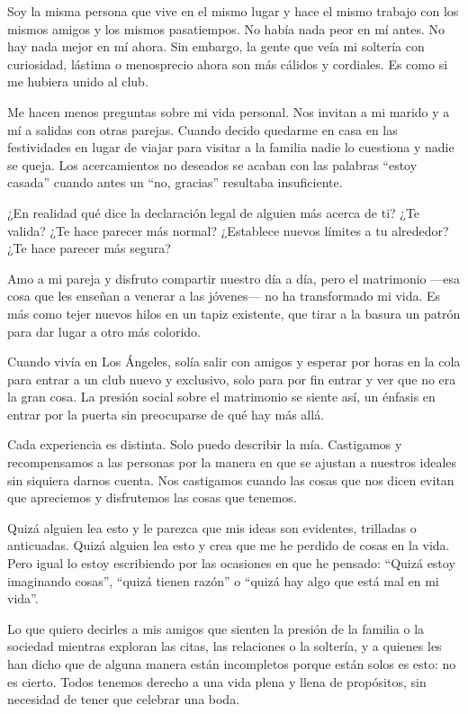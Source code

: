 Soy la misma persona que vive en el mismo lugar y hace el mismo trabajo
con los mismos amigos y los mismos pasatiempos. No había nada peor en mí
antes. No hay nada mejor en mí ahora. Sin embargo, la gente que veía mi
soltería con curiosidad, lástima o menosprecio ahora son más cálidos y
cordiales. Es como si me hubiera unido al club.

Me hacen menos preguntas sobre mi vida personal. Nos invitan a mi marido
y a mí a salidas con otras parejas. Cuando decido quedarme en casa en
las festividades en lugar de viajar para visitar a la familia nadie lo
cuestiona y nadie se queja. Los acercamientos no deseados se acaban con
las palabras ``estoy casada'' cuando antes un ``no, gracias'' resultaba
insuficiente.

¿En realidad qué dice la declaración legal de alguien más acerca de ti?
¿Te valida? ¿Te hace parecer más normal? ¿Establece nuevos límites a tu
alrededor? ¿Te hace parecer más segura?

Amo a mi pareja y disfruto compartir nuestro día a día, pero el
matrimonio ---esa cosa que les enseñan a venerar a las jóvenes--- no ha
transformado mi vida. Es más como tejer nuevos hilos en un tapiz
existente, que tirar a la basura un patrón para dar lugar a otro más
colorido.

Cuando vivía en Los Ángeles, solía salir con amigos y esperar por horas
en la cola para entrar a un club nuevo y exclusivo, solo para por fin
entrar y ver que no era la gran cosa. La presión social sobre el
matrimonio se siente así, un énfasis en entrar por la puerta sin
preocuparse de qué hay más allá.

Cada experiencia es distinta. Solo puedo describir la mía. Castigamos y
recompensamos a las personas por la manera en que se ajustan a nuestros
ideales sin siquiera darnos cuenta. Nos castigamos cuando las cosas que
nos dicen evitan que apreciemos y disfrutemos las cosas que tenemos.

Quizá alguien lea esto y le parezca que mis ideas son evidentes,
trilladas o anticuadas. Quizá alguien lea esto y crea que me he perdido
de cosas en la vida. Pero igual lo estoy escribiendo por las ocasiones
en que he pensado: ``Quizá estoy imaginando cosas'', ``quizá tienen
razón'' o ``quizá hay algo que está mal en mi vida''.

Lo que quiero decirles a mis amigos que sienten la presión de la familia
o la sociedad mientras exploran las citas, las relaciones o la soltería,
y a quienes les han dicho que de alguna manera están incompletos porque
están solos es esto: no es cierto. Todos tenemos derecho a una vida
plena y llena de propósitos, sin necesidad de tener que celebrar una
boda.

